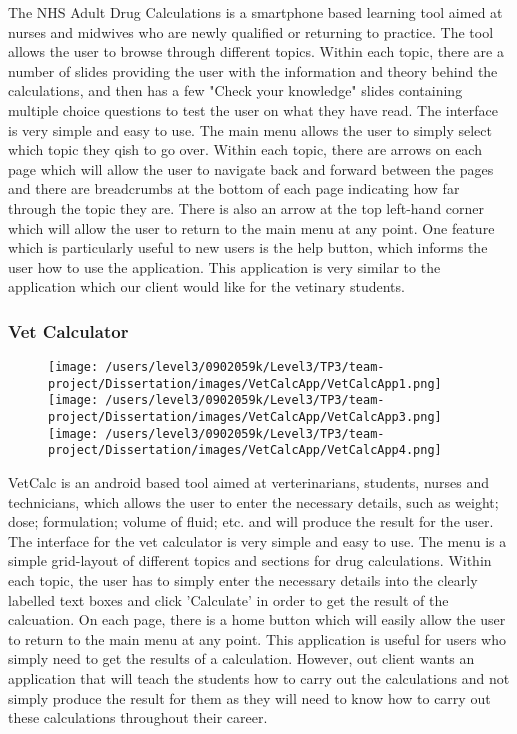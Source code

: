 \documentclass{l3proj}
\begin{document}
The NHS Adult Drug Calculations is a smartphone based learning tool aimed at nurses and midwives who are newly qualified or returning to practice. The tool allows the user to browse through different topics. Within each topic, there are a number of slides providing the user with the information and theory behind the calculations, and then has a few "Check your knowledge" slides containing multiple choice questions to test the user on what they have read. The interface is very simple and easy to use. The main menu allows the user to simply select which topic they qish to go over. Within each topic, there are arrows on each page which will allow the user to navigate back and forward between the pages and there are breadcrumbs at the bottom of each page indicating how far through the topic they are.  There is also an arrow at the top left-hand corner which will allow the user to return to the main menu at any point. One feature which is particularly useful to new users is the help button, which informs the user how to use the application. This application is very similar to the application which our client would like for the vetinary students.

\subsubsection{Vet Calculator}

\begin{figure}[!htb]
  \texttt{[image: /users/level3/0902059k/Level3/TP3/team-project/Dissertation/images/VetCalcApp/VetCalcApp1.png]}
\endminipage\hfill
{}
  \texttt{[image: /users/level3/0902059k/Level3/TP3/team-project/Dissertation/images/VetCalcApp/VetCalcApp3.png]}
\endminipage\hfill
{}%
  \texttt{[image: /users/level3/0902059k/Level3/TP3/team-project/Dissertation/images/VetCalcApp/VetCalcApp4.png]}
\endminipage
\end{figure}

VetCalc is an android based tool aimed at verterinarians, students, nurses and technicians, which allows the user to enter the necessary details, such as weight; dose; formulation; volume of fluid; etc. and will produce the result for the user. The interface for the vet calculator is very simple and easy to use. The menu is a simple grid-layout of different topics and sections for drug calculations. Within each topic, the user has to simply enter the necessary details into the clearly labelled text boxes and click 'Calculate' in order to get the result of the calcuation. On each page, there is a home button which will easily allow the user to return to the main menu at any point. This application is useful for users who simply need to get the results of a calculation. However, out client wants an application that will teach the students how to carry out the calculations and not simply produce the result for them as they will need to know how to carry out these calculations throughout their career.
\end{document}
